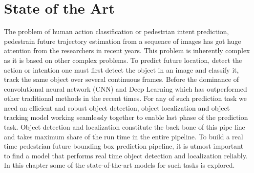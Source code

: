 \chapter{State of the Art}








The problem of human action classification or pedestrian intent prediction, pedestrain future trajectory estimation \cite{saleh2017intent, fang2018pedestrian, abu2018will, dollar2005behavior, rasouli2017agreeing, cao2017realtime} from a sequence of images has got huge attention from the researchers in recent years. This problem is inherently complex as it is based on other complex problems. To predict future location, detect the action or intention one must first detect the object in an image and classify it, track the same object over several continuous frames. Before the dominance of convolutional neural network (CNN) and Deep Learning which has outperformed other traditional methods in the recent times. For any of such prediction task we need an efficient and robust object detection, object localization and object tracking model working seamlessly together to enable last phase of the prediction task. Object detection and localization constitute the back bone of this pipe line and takes maximum share of the run time in the entire pipeline. To build a real time pedestrian future bounding box prediction pipeline, it is utmost important to find a model that performs real time object detection \cite{felzenszwalb2009object, walk2010new, liu2016ssd, szegedy2014scalable, dollar2009pedestrian, dollar2011pedestrian} and localization reliably. In this chapter some of the state-of-the-art models for such tasks is explored.

